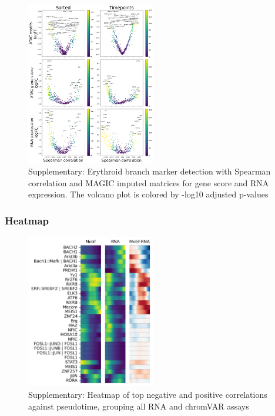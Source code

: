 \documentclass[a4paper]{article}
\begin{document}
\begin{figure}[!htb]
  \centering
  \includegraphics[width=0.5\textwidth]{../figures/hematopoiesis/Basophil_40_109_smooth_magic_single_branch_volcanos_motifs.png}
  \caption{Supplementary: Erythroid branch marker detection with Spearman correlation and MAGIC imputed matrices for gene score and RNA expression. The volcano plot is colored by -log10 adjusted p-values}
\end{figure}

\FloatBarrier
\subsubsection{Heatmap}

\begin{figure}[!htb]
  \centering
  \includegraphics[width=0.5\textwidth]{../figures/hematopoiesis/Basophil_40_109_single_smooth_none_heatmap_grouped_assays.png}
  \caption{Supplementary: Heatmap of top negative and positive correlations against pseudotime, grouping all RNA and chromVAR assays}
\end{figure}
\end{document}
